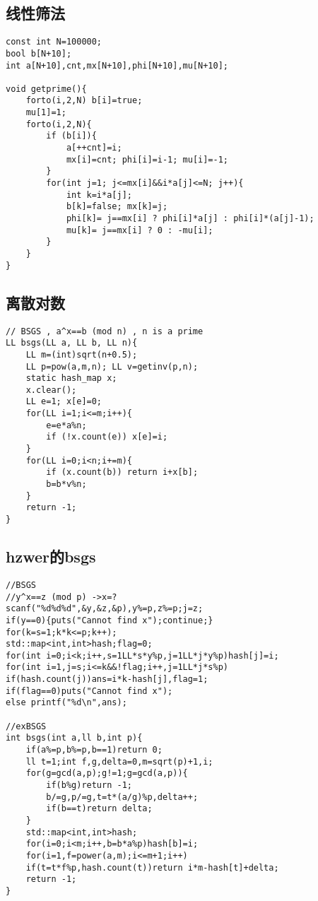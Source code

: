 \documentclass{article}
\begin{document}
\subsection{线性筛法}
\begin{lstlisting}
const int N=100000;
bool b[N+10];
int a[N+10],cnt,mx[N+10],phi[N+10],mu[N+10];

void getprime(){
	forto(i,2,N) b[i]=true;
	mu[1]=1;
	forto(i,2,N){
		if (b[i]){
			a[++cnt]=i;
			mx[i]=cnt; phi[i]=i-1; mu[i]=-1;
		}
		for(int j=1; j<=mx[i]&&i*a[j]<=N; j++){
			int k=i*a[j];
			b[k]=false; mx[k]=j;
			phi[k]= j==mx[i] ? phi[i]*a[j] : phi[i]*(a[j]-1);
			mu[k]= j==mx[i] ? 0 : -mu[i];
		}
	}
}
\end{lstlisting}

\subsection{离散对数}
\begin{lstlisting}
// BSGS , a^x==b (mod n) , n is a prime
LL bsgs(LL a, LL b, LL n){
	LL m=(int)sqrt(n+0.5);
	LL p=pow(a,m,n); LL v=getinv(p,n);
	static hash_map x;
	x.clear();
	LL e=1; x[e]=0;
	for(LL i=1;i<=m;i++){
		e=e*a%n;
		if (!x.count(e)) x[e]=i;
	}
	for(LL i=0;i<n;i+=m){
		if (x.count(b)) return i+x[b];
		b=b*v%n;
	}
	return -1;
}
\end{lstlisting}

\subsection{hzwer的bsgs}
\begin{lstlisting}
//BSGS
//y^x==z (mod p) ->x=?
scanf("%d%d%d",&y,&z,&p),y%=p,z%=p;j=z;
if(y==0){puts("Cannot find x");continue;}
for(k=s=1;k*k<=p;k++);
std::map<int,int>hash;flag=0;
for(int i=0;i<k;i++,s=1LL*s*y%p,j=1LL*j*y%p)hash[j]=i;
for(int i=1,j=s;i<=k&&!flag;i++,j=1LL*j*s%p)
if(hash.count(j))ans=i*k-hash[j],flag=1;
if(flag==0)puts("Cannot find x");
else printf("%d\n",ans);

//exBSGS
int bsgs(int a,ll b,int p){
    if(a%=p,b%=p,b==1)return 0;
    ll t=1;int f,g,delta=0,m=sqrt(p)+1,i;
    for(g=gcd(a,p);g!=1;g=gcd(a,p)){
        if(b%g)return -1;
        b/=g,p/=g,t=t*(a/g)%p,delta++;
        if(b==t)return delta;
    }
    std::map<int,int>hash;
    for(i=0;i<m;i++,b=b*a%p)hash[b]=i;
    for(i=1,f=power(a,m);i<=m+1;i++)
    if(t=t*f%p,hash.count(t))return i*m-hash[t]+delta;
    return -1;
}
\end{lstlisting}
\end{document}
